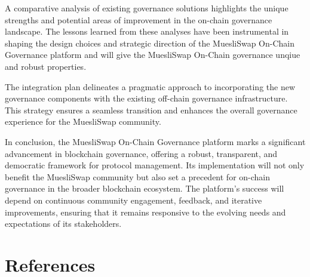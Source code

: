 \documentclass[11pt]{article}
\begin{document}
A comparative analysis of existing governance solutions highlights the unique strengths and potential areas of improvement in the on-chain governance landscape.
The lessons learned from these analyses have been instrumental in shaping the design choices and strategic direction of the MuesliSwap On-Chain Governance platform
and will give the MuesliSwap On-Chain governance unqiue and robust properties.

The integration plan delineates a pragmatic approach to incorporating the new governance components with the existing off-chain governance infrastructure.
This strategy ensures a seamless transition and enhances the overall governance experience for the MuesliSwap community.

In conclusion, the MuesliSwap On-Chain Governance platform marks a significant advancement in blockchain governance, offering a robust, transparent, and democratic framework for protocol management.
Its implementation will not only benefit the MuesliSwap community but also set a precedent for on-chain governance in the broader blockchain ecosystem.
The platform's success will depend on continuous community engagement, feedback, and iterative improvements, ensuring that it remains responsive to the evolving needs and expectations of its stakeholders.

\section{References}

\printbibliography
\end{document}
